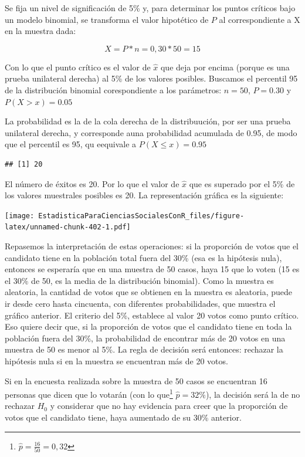 \documentclass[]{book}
\let\rmarkdownfootnote\footnote%
\def\footnote{\protect\rmarkdownfootnote}
\begin{document}
Se fija un nivel de significación de 5\% y, para determinar los puntos
críticos bajo un modelo binomial, se transforma el valor hipotético de \(P\) al correspondiente a X en la muestra dada:

\[X = P*n = 0,30*50 = 15\]

Con lo que el punto crítico es el valor de \(\widehat{x}\) que deja por
encima (porque es una prueba unilateral derecha) al 5\% de los valores
posibles. Buscamos el percentil 95 de la distribución binomial corespondiente a los parámetros:
\(n = 50\), \(P = 0.30\) y \(P( X > x) = 0.05\)

La probabilidad es la de la cola derecha de la distribuución, por ser una prueba unilateral derecha, y corresponde auna probabilidad acumulada de 0.95, de modo que el percentil es 95, qu eequivale a \(P( X \leq x) = 0.95\)

\begin{verbatim}
## [1] 20
\end{verbatim}

El número de éxitos es 20. Por lo que el valor de \(\widehat{x}\) que
es superado por el 5\% de los valores muestrales posibles es 20. La
representación gráfica es la siguiente:

\texttt{[image: EstadisticaParaCienciasSocialesConR\_files/figure-latex/unnamed-chunk-402-1.pdf]}

Repasemos la interpretación de estas operaciones: si la proporción de
votos que el candidato tiene en la población total fuera del 30\% (esa es
la hipótesis nula), entonces se esperaría que en una muestra de 50
casos, haya 15 que lo voten (15 es el 30\% de 50, es la media de la distribución binomial). Como la muestra es
aleatoria, la cantidad de votos que se obtienen en la muestra es
aleatoria, puede ir desde cero hasta cincuenta, con diferentes
probabilidades, que muestra el gráfico anterior. El criterio del 5\%,
establece al valor 20 votos como punto crítico. Eso quiere decir que, si
la proporción de votos que el candidato tiene en toda la población fuera
del 30\%, la probabilidad de encontrar más de 20 votos en una muestra de
50 es menor al 5\%. La regla de decisión será entonces: rechazar la
hipótesis nula si en la muestra se encuentran más de 20 votos.

Si en la encuesta realizada sobre la muestra de 50 casos se encuentran
16 personas que dicen que lo votarán (con lo que\footnote{\(\widehat{p} = \frac{16}{50} = 0,32\)}
\(\widehat{p} = 32\%\)), la decisión será la de no rechazar \(H_{0}\) y
considerar que no hay evidencia para creer que la proporción de votos
que el candidato tiene, haya aumentado de su 30\% anterior.
\end{document}
